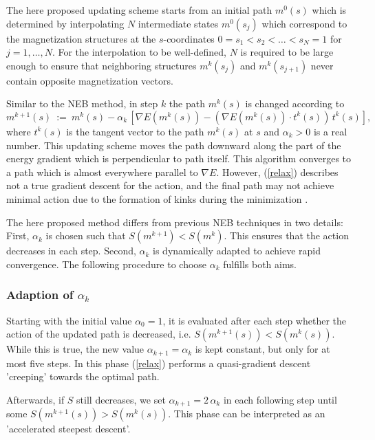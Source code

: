 The here proposed updating scheme starts from an
initial path $m^0(s)$ which is 
determined  by interpolating  $N$ intermediate states
$m^0(s_j)$ which correspond to the magnetization structures at the 
$s$-coordinates $0=s_1<s_2<\ldots<s_N=1$ for $j=1,\ldots, N$.
For the interpolation to be well-defined,  $N$ is required to be large enough 
to ensure that neighboring structures $m^k(s_j)$ and $m^k(s_{j+1})$ never contain opposite 
magnetization vectors. 

Similar to the NEB method, in step $k$ the path $m^k(s)$ is changed according to
\begin{equation}\label{relax}
    m^{k+1}(s) ~:=~  m^{k}(s) - \alpha_k \, \left[ \nabla E(m^k(s))-
          \left( \nabla E(m^k(s)) \cdot t^k(s)  \right)\,t^k(s)\right],
\end{equation}
where $t^k(s)$ is the tangent vector to the path $m^k(s)$  at $s$ and
$\alpha_k>0$ is a real number.
This updating scheme moves the path downward along the part of the energy gradient which
is perpendicular to path itself. This algorithm 
converges to a path which is almost everywhere 
parallel to $\nabla E$.
However,  (\ref{relax}) describes  not a true gradient 
descent for the action, and the final path may not achieve minimal action
  due to the formation of kinks during the minimization 
\cite{Henkelman:00a,Henkelman:00b,Dittrich:02}.

The here proposed method differs from previous NEB techniques  
in two details:
First,  
$\alpha_k$ is chosen such that $S( m^{k+1})< S( m^{k})$. This ensures that 
the action decreases in each step.
Second, $\alpha_k$ is dynamically adapted to achieve rapid convergence.
The following procedure to choose  $\alpha_k$  
fulfills both aims.
 
\subsubsection*{Adaption of $\alpha_k$}
Starting with the  initial value $\alpha_0=1$,
it is evaluated after each step whether the action of the updated path is decreased, i.e.
$ S( m^{k+1}(s)) < S( m^{k}(s))$. 
%
While this is true, the new value
$\alpha_{k+1}=\alpha_k$ is kept constant, but only for at most five steps. 
In this phase (\ref{relax}) performs a  quasi-gradient descent 'creeping' towards 
the optimal path. 

Afterwards,
if $S$ still decreases, we set $\alpha_{k+1}=2\,\alpha_k$ 
in each following step until
some $ S( m^{k+1}(s)) > S( m^{k}(s))$.
This phase can be interpreted as an 'accelerated steepest descent'.

